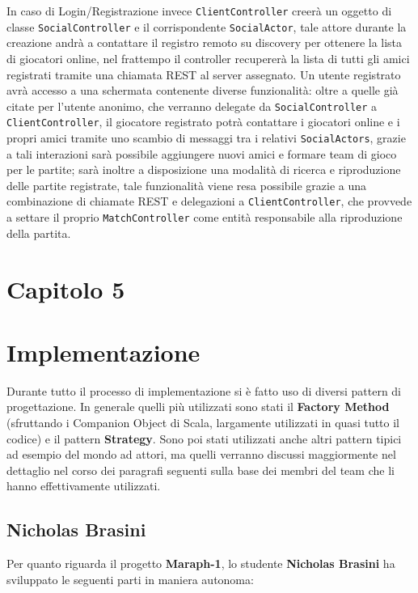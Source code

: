     In caso di Login/Registrazione invece \texttt{ClientController} creerà un oggetto di classe \texttt{SocialController} e il corrispondente \texttt{SocialActor}, tale attore durante la creazione andrà a contattare il registro remoto su discovery per ottenere la lista di giocatori online, nel frattempo il controller recupererà la lista di tutti gli amici registrati tramite una chiamata REST al server assegnato. Un utente registrato avrà accesso a una schermata contenente diverse funzionalità: oltre a quelle già citate per l'utente anonimo, che verranno delegate da \texttt{SocialController} a \texttt{ClientController}, il giocatore registrato potrà contattare i giocatori online e i propri amici tramite uno scambio di messaggi tra i relativi \texttt{SocialActors}, grazie a tali interazioni sarà possibile aggiungere nuovi amici e formare team di gioco per le partite; sarà inoltre a disposizione una modalità di ricerca e riproduzione delle partite registrate, tale funzionalità viene resa possibile grazie a una combinazione di chiamate REST e delegazioni a \texttt{ClientController}, che provvede a settare il proprio \texttt{MatchController} come entità responsabile alla riproduzione della partita.

    \clearpage

 \section*{\Huge {\textbf Capitolo 5}\label{chapter5}}

     \section{Implementazione}\label{sec:implementation}

     Durante tutto il processo di implementazione si è fatto uso di diversi pattern di progettazione. In generale quelli più utilizzati sono stati il \textbf{Factory Method} (sfruttando i Companion Object di Scala, largamente utilizzati in quasi tutto il codice) e il pattern \textbf{Strategy}. Sono poi stati utilizzati anche altri pattern tipici ad esempio del mondo ad attori, ma quelli verranno discussi maggiormente nel dettaglio nel corso dei paragrafi seguenti sulla base dei membri del team che li hanno effettivamente utilizzati.

        \subsection{Nicholas Brasini}\label{subsec:brasini}
        Per quanto riguarda il progetto \textbf{Maraph-1}, lo studente \textbf{Nicholas Brasini} ha sviluppato le seguenti parti in maniera autonoma:

